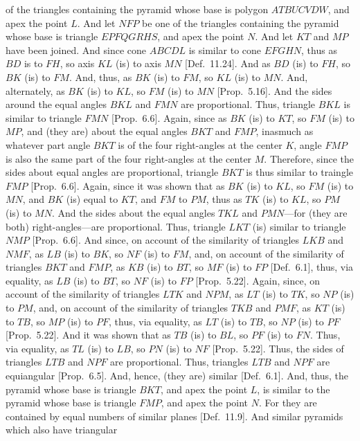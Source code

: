 of the triangles containing the pyramid whose base is polygon $ATBUCVDW$, and apex the point $L$. And let
$NFP$ be one of the triangles containing the pyramid whose base is triangle $EPFQGRHS$, and apex the point
$N$. And let $KT$ and $MP$ have been joined. And since cone $ABCDL$ is similar to cone $EFGHN$, thus as
$BD$ is to $FH$, so axis $KL$ (is) to axis $MN$ [Def.~11.24].  And as $BD$ (is) to
$FH$, so $BK$ (is) to $FM$. And, thus, as $BK$ (is) to $FM$, so $KL$ (is) to $MN$. And, alternately, as $BK$ (is)
to $KL$, so $FM$ (is) to $MN$ [Prop.~5.16]. And the sides around the equal angles $BKL$ and
$FMN$ are proportional. Thus, triangle $BKL$ is similar to triangle $FMN$
[Prop.~6.6]. Again, since as $BK$ (is) to $KT$, so
$FM$ (is) to $MP$, and (they are) about the equal angles $BKT$ and $FMP$, inasmuch as whatever part angle $BKT$
is of the four right-angles at the center $K$, angle $FMP$ is also the same part of the four right-angles at the  center $M$. 
Therefore, since the sides about equal angles are proportional,  triangle $BKT$ is thus similar to traingle $FMP$ [Prop.~6.6].
Again, since it was shown that as $BK$ (is) to $KL$, so $FM$ (is) to $MN$, and $BK$ (is) equal to $KT$, and
$FM$ to $PM$, thus as $TK$ (is) to $KL$, so $PM$ (is) to $MN$. And the sides about the equal angles
$TKL$ and $PMN$---for (they are both) right-angles---are proportional.  Thus, triangle $LKT$ (is) similar to
triangle $NMP$ [Prop.~6.6]. And since, on account of the similarity of triangles $LKB$ and
$NMF$, as $LB$ (is) to $BK$, so $NF$ (is) to $FM$, and, on account of the  similarity of triangles $BKT$ and
$FMP$, as $KB$ (is) to $BT$, so $MF$ (is) to $FP$ [Def.~6.1], thus, via equality, as $LB$ (is)
to $BT$, so $NF$ (is) to $FP$ [Prop.~5.22]. Again, since, on account of the similarity of
triangles $LTK$ and $NPM$, as $LT$ (is) to $TK$, so $NP$ (is) to $PM$, and, on account of the similarity of
triangles $TKB$ and $PMF$, as $KT$ (is) to $TB$, so $MP$ (is) to $PF$, thus, via equality,  as $LT$ (is) to $TB$, so
$NP$ (is) to $PF$ [Prop.~5.22]. And it was shown that as $TB$ (is) to $BL$, so $PF$ (is) to $FN$.
 Thus, via equality, as $TL$ (is) to $LB$, so $PN$ (is) to $NF$ [Prop.~5.22]. Thus, the sides of triangles
 $LTB$ and $NPF$ are proportional. Thus, triangles $LTB$ and $NPF$ are equiangular [Prop.~6.5]. 
 And, hence, (they are) similar [Def.~6.1]. And, thus, the pyramid whose base is triangle $BKT$, and
 apex the point $L$, is similar to the pyramid whose base is triangle $FMP$, and apex the point $N$. For they are contained
 by equal numbers of similar planes [Def.~11.9]. And similar pyramids which also have triangular
